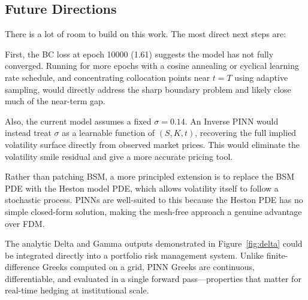\documentclass[11pt, twocolumn]{article}
\begin{document}
\subsection{Future Directions}

There is a lot of room to build on this work. The most direct next steps are:

First, the BC loss at epoch 10000 (1.61) suggests the model has not fully converged. Running for more epochs with a cosine annealing or cyclical learning rate schedule, and concentrating collocation points near $t=T$ using adaptive sampling, would directly address the sharp boundary problem and likely close much of the near-term gap.

Also, the current model assumes a fixed $\sigma=0.14$. An Inverse PINN would instead treat $\sigma$ as a learnable function of $(S, K, t)$, recovering the full implied volatility surface directly from observed market prices. This would eliminate the volatility smile residual and give a more accurate pricing tool.

Rather than patching BSM, a more principled extension is to replace the BSM PDE with the Heston model PDE, which allows volatility itself to follow a stochastic process. PINNs are well-suited to this because the Heston PDE has no simple closed-form solution, making the mesh-free approach a genuine advantage over FDM.

The analytic Delta and Gamma outputs demonstrated in Figure~\ref{fig:delta} could be integrated directly into a portfolio risk management system. Unlike finite-difference Greeks computed on a grid, PINN Greeks are continuous, differentiable, and evaluated in a single forward pass---properties that matter for real-time hedging at institutional scale.



\end{document}
